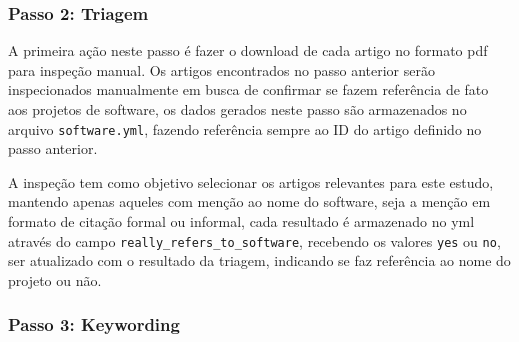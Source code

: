 
\subsubsection{Passo 2: Triagem}


A primeira ação neste passo é fazer o download de cada artigo no formato pdf
para inspeção manual.
Os artigos encontrados no passo anterior serão inspecionados manualmente em
busca de confirmar se fazem referência de fato aos projetos de software,
os dados gerados neste passo são armazenados no arquivo \texttt{software.yml},
fazendo referência sempre ao ID do artigo definido no passo anterior.

A inspeção tem como objetivo selecionar os artigos relevantes para este estudo,
mantendo apenas aqueles com menção ao nome do software, seja a menção em
formato de citação formal ou informal, cada resultado é armazenado no yml
através do campo \texttt{really\_refers\_to\_software}, recebendo os valores
\texttt{yes} ou \texttt{no}, ser atualizado com o resultado da triagem,
indicando se faz referência ao nome do projeto ou não.



\subsubsection{Passo 3: Keywording}



